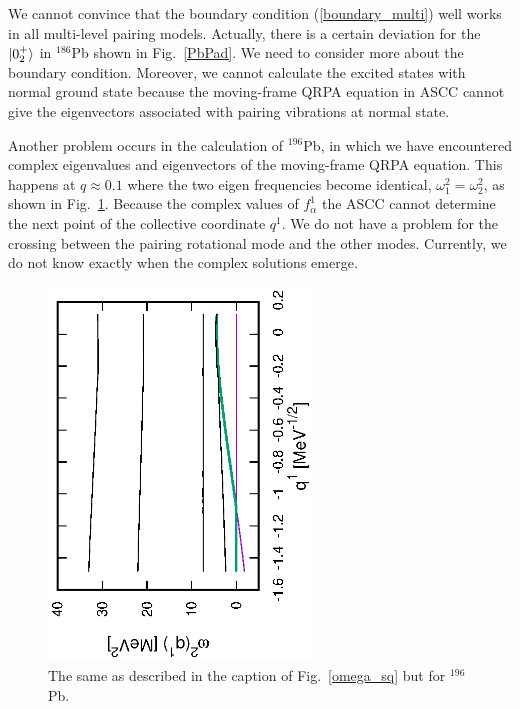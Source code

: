 \documentclass[11pt]{book} %
\begin{document}
We cannot convince that the boundary condition (\ref{boundary_multi}) well works in all multi-level pairing models. Actually, there is a certain deviation for the $\ket{0_2^+}$ in ${}^{186}$Pb shown in Fig.~\ref{PbPad}. We need to consider more about the boundary condition. Moreover, we cannot calculate the excited states with normal ground state because the moving-frame QRPA equation in ASCC cannot give the eigenvectors associated with pairing vibrations at normal state. 

Another problem occurs in the calculation of ${}^{196}$Pb, in which we have encountered complex eigenvalues and eigenvectors of the moving-frame QRPA equation. This happens at $q\approx0.1$ where the two eigen frequencies become identical, $\omega_1^2=\omega_2^2$, as shown in Fig.~\ref{196Pbomega-sq}. Because the complex values of $f^1_{\alpha}$ the ASCC cannot determine the next point of the collective coordinate $q^1$. We do not have a problem for the crossing between the pairing rotational mode and the other modes. Currently, we do not know exactly when the complex solutions emerge.

\begin{figure}[bt]
 \begin{center}
  \includegraphics[width=70mm,angle=-90]{images/196Pbomega_sq.eps}
 \end{center}
	\caption{The same as described in the caption of Fig.~\ref{omega_sq} but for ${}^{196}$ Pb.
}
 \label{196Pbomega-sq}
\end{figure}

\end{document}
